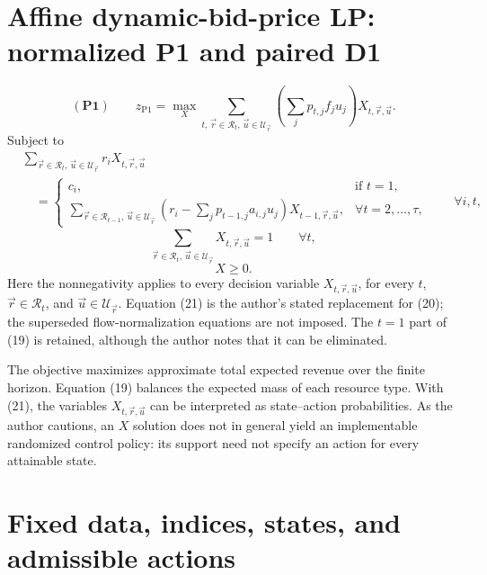 \documentclass{article}
\begin{document}
\section*{Affine dynamic-bid-price LP: normalized P1 and paired D1}

\begin{equation}
(\mathbf{P1})\qquad
z_{\mathrm{P1}}=\max_X
\sum_{t,\,\vec r\in\mathscr R_t,\,\vec u\in\mathscr U_{\vec r}}
\left(\sum_j p_{t,j}f_j u_j\right)X_{t,\vec r,\vec u}.
\tag{18}
\end{equation}
Subject to
\begin{equation}
\begin{split}
&\sum_{\vec r\in\mathscr R_t,\,\vec u\in\mathscr U_{\vec r}}
 r_iX_{t,\vec r,\vec u}\\
&\quad=
\begin{cases}
c_i, &\text{if }t=1,\\[2pt]
\displaystyle
\sum_{\vec r\in\mathscr R_{t-1},\,\vec u\in\mathscr U_{\vec r}}
\left(r_i-\sum_j p_{t-1,j}a_{i,j}u_j\right)
X_{t-1,\vec r,\vec u},
&\forall t=2,\ldots,\tau,
\end{cases}
\qquad\forall i,t,
\end{split}
\tag{19}
\end{equation}
\begin{equation}
\sum_{\vec r\in\mathscr R_t,\,\vec u\in\mathscr U_{\vec r}}
X_{t,\vec r,\vec u}=1
\qquad\forall t,
\tag{21}
\end{equation}
\[
X\geqslant0.
\]
Here the nonnegativity applies to every decision variable
\(X_{t,\vec r,\vec u}\), for every \(t\),
\(\vec r\in\mathscr R_t\), and \(\vec u\in\mathscr U_{\vec r}\).
Equation (21) is the author's stated replacement for (20); the superseded
flow-normalization equations are not imposed. The \(t=1\) part of (19)
is retained, although the author notes that it can be eliminated.

The objective maximizes approximate total expected revenue over the finite
horizon. Equation (19) balances the expected mass of each resource type.
With (21), the variables \(X_{t,\vec r,\vec u}\) can be interpreted as
state--action probabilities. As the author cautions, an \(X\) solution
does not in general yield an implementable randomized control policy:
its support need not specify an action for every attainable state.

\section*{Fixed data, indices, states, and admissible actions}
\end{document}

